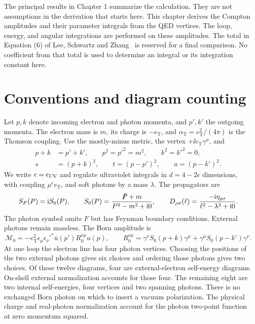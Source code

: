 The principal results in Chapter 1 summarize the calculation. They are
not assumptions in the derivation that starts here. This chapter derives
the Compton amplitudes and their parameter integrals
from the QED vertices. The loop, energy, and angular integrations are performed on these
amplitudes. The total in Equation (6) of Lee, Schwartz and
Zhang~\cite{qed-processes-lsz} is reserved for a final comparison. No coefficient from that total is used
to determine an integral or its integration constant here.

\section{Conventions and diagram counting}
Let $p,k$ denote incoming electron and photon momenta, and $p',k'$
the outgoing momenta. The electron mass is $m$, its charge is
$-e_{\mathrm T}$, and $\alpha_{\mathrm T}=e_{\mathrm T}^2/(4\pi)$
is the Thomson coupling. Use the mostly-minus metric, the vertex
$+\ii e_{\mathrm T}\gamma^\mu$, and
\begin{align}
 p+k&=p'+k',\qquad p^2=p'^2=m^2,\qquad k^2=k'^2=0,\\
 s&=(p+k)^2,\qquad t=(p-p')^2,\qquad u=(p-k')^2.
\end{align}
We write $\epsilon=\epsilon_{\rm UV}$ and regulate ultraviolet integrals in $d=4-2\epsilon$ dimensions,
with coupling $\mu^\epsilon e_{\mathrm T}$, and soft photons by a
mass $\lambda$. The propagators are
\begin{equation}
 S_F(P)=\mathrm{i} S_0(P),\qquad S_0(P)=\frac{\slashed P+m}{P^2-m^2+\mathrm{i}0},
 \qquad D_{\rho\sigma}(\ell)=\frac{-\mathrm{i}\eta_{\rho\sigma}}
                                      {\ell^2-\lambda^2+\mathrm{i}0}.
\end{equation}
The photon symbol omits $F$ but has Feynman boundary conditions.
External photons remain massless.
The Born amplitude is
\begin{equation}
 \mathcal M_0=-e_{\mathrm T}^2\epsilon_\mu\epsilon_\nu'^*
 \bar u(p')R_0^{\nu\mu}u(p),\qquad
 R_0^{\nu\mu}=\gamma^\nu S_0(p+k)\gamma^\mu
                         +\gamma^\mu S_0(p-k')\gamma^\nu.
\end{equation}
At one loop the electron line has four photon vertices. Choosing
the positions of the two external photons gives six choices and
ordering those photons gives two choices. Of these twelve diagrams,
four are external-electron self-energy diagrams. On-shell external
normalization accounts for those four. The remaining eight are two
internal self-energies, four vertices and two spanning photons.
There is no exchanged Born photon on which to insert a vacuum
polarization. The physical charge and real-photon normalization
account for the photon two-point function at zero momentum squared.

